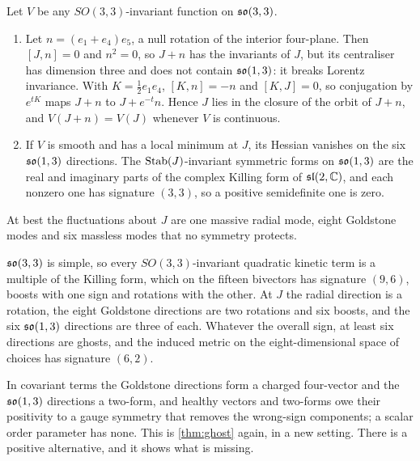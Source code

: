 \begin{theorem}
\label{thm:flat}
Let $V$ be any $SO(3,3)$-invariant function on $\mathfrak{so}(3,3)$.
\begin{enumerate}[label=(\roman*),leftmargin=2.2em]
\item Let $n=(e_1+e_4)e_5$, a null rotation of the interior four-plane. Then $[J,n]=0$ and $n^2=0$, so $J+n$ has the invariants of $J$, but its centraliser has dimension three
and does not contain $\mathfrak{so}(1,3)$: it breaks Lorentz invariance. With $K=\tfrac12e_1e_4$, $[K,n]=-n$ and $[K,J]=0$, so conjugation by $e^{tK}$ maps $J+n$ to $J+e^{-t}n$. Hence $J$
lies in the closure of the orbit of $J+n$, and $V(J+n)=V(J)$ whenever $V$ is continuous.
\item If $V$ is smooth and has a local minimum at $J$, its Hessian vanishes on the six $\mathfrak{so}(1,3)$ directions. The $\operatorname{Stab}(J)$-invariant symmetric forms on $\mathfrak{so}(1,3)$ are the real
and imaginary parts of the complex Killing form of $\mathfrak{sl}(2,\mathbb{C})$, and each nonzero one has signature $(3,3)$, so a positive semidefinite one is zero.
\end{enumerate}
At best the fluctuations about $J$ are one massive radial mode, eight Goldstone modes and six massless modes that no symmetry protects.
\end{theorem}

\begin{proposition}
\label{prop:kineticB}
$\mathfrak{so}(3,3)$ is simple, so every $SO(3,3)$-invariant quadratic kinetic term is a multiple of the Killing form, which on the fifteen bivectors has signature $(9,6)$, boosts with
one sign and rotations with the other. At $J$ the radial direction is a rotation, the eight Goldstone directions are two rotations and six boosts, and the six $\mathfrak{so}(1,3)$
directions are three of each. Whatever the overall sign, at least six directions are ghosts, and the induced metric on the eight-dimensional space of choices has
signature $(6,2)$.
\end{proposition}

In covariant terms the Goldstone directions form a charged four-vector and the $\mathfrak{so}(1,3)$ directions a two-form, and healthy vectors and two-forms owe their positivity to a
gauge symmetry that removes the wrong-sign components; a scalar order parameter has none. This is \cref{thm:ghost} again, in a new setting. There is a positive
alternative, and it shows what is missing.

